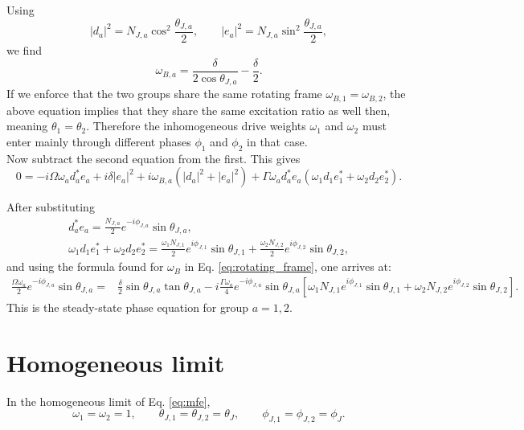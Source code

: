 \documentclass[11pt]{article}
\begin{document}
Using
\begin{equation}
|d_a|^2
=
N_{J,a}\cos^2\frac{\theta_{J,a}}{2},
\qquad
|e_a|^2
=
N_{J,a}\sin^2\frac{\theta_{J,a}}{2},
\end{equation}
we find
\begin{equation} \label{eq:rotating_frame}
\omega_{B,a}
=
\frac{
\delta 
}{
2\cos\theta_{J,a}
} - \frac{\delta}{2}.
\end{equation}
If we enforce that the two groups share the same rotating frame $\omega_{B,1} = \omega_{B,2}$, the above equation implies that they share the same excitation ratio as well then, meaning  $\theta_1 = \theta_2$. Therefore the inhomogeneous drive weights \(\omega_1\) and \(\omega_2\) must enter mainly through different phases \(\phi_1\) and \(\phi_2\) in that case.
\\

Now subtract the second equation from the first. This gives
\begin{equation}
0
=
-i\Omega\omega_a d_a^{*}e_a
+
i\delta |e_a|^2
+
i\omega_{B,a}
(
|d_a|^2+|e_a|^2
)
+
\Gamma \omega_a d_a^{*}e_a
(
\omega_1 d_1e_1^{*}
+
\omega_2 d_2e_2^{*}
).
\end{equation}

After substituting
\begin{equation}
\begin{gathered}
d_a^{*}e_a
=
\frac{N_{J,a}}{2}
e^{-i\phi_{J,a}}
\sin\theta_{J,a},
\\
\omega_1 d_1e_1^{*}
+
\omega_2 d_2e_2^{*}
=
\frac{\omega_1 N_{J,1}}{2}
e^{i\phi_{J,1}}
\sin\theta_{J,1}
+
\frac{\omega_2 N_{J,2}}{2}
e^{i\phi_{J,2}}
\sin\theta_{J,2},
\end{gathered}
\end{equation}
and using the formula found for $\omega_B$ in Eq. \ref{eq:rotating_frame}, one arrives at:
\begin{equation} \label{eq:mfe}
\boxed{
\begin{aligned}
\frac{\Omega\omega_a}{2}
e^{-i\phi_{J,a}}
\sin\theta_{J,a}
=
&\frac{\delta}{2}
\sin \theta_{J,a} \tan \theta_{J,a}
-
i\frac{\Gamma \omega_a}{4}
e^{-i\phi_{J,a}}
\sin\theta_{J,a}
\left[
\omega_1 N_{J,1} e^{i\phi_{J,1}} \sin\theta_{J,1}
+
\omega_2 N_{J,2}e^{i\phi_{J,2}} \sin\theta_{J,2}
\right].
\end{aligned}
}
\end{equation}
This is the steady-state phase equation for group \(a=1,2\).

\section{Homogeneous limit}
In the homogeneous limit of Eq. \ref{eq:mfe},
\begin{equation}
\omega_1=\omega_2=1,
\qquad
\theta_{J,1}=\theta_{J,2}=\theta_J,
\qquad
\phi_{J,1}=\phi_{J,2}=\phi_J.
\end{equation}
\end{document}

